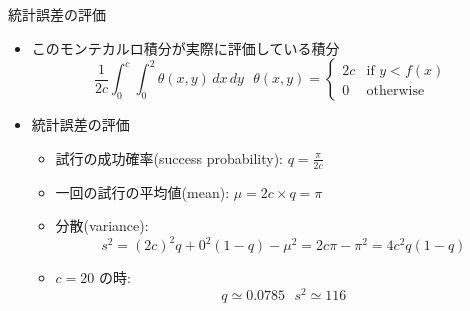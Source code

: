 \begin{frame}[t,fragile]{統計誤差の評価}
  \begin{itemize}
    \setlength{\itemsep}{1em}
  \item このモンテカルロ積分が実際に評価している積分
    \[
    \frac{1}{2c} \int_0^c \!\! \int_0^2 \!\! \theta(x,y) \, dx \, dy
    \ \ \ \theta(x,y) = \begin{cases} 2c & \text{if $y < f(x)$} \\ 0 & \text{otherwise} \end{cases}
    \]
  \item 統計誤差の評価
    \begin{itemize}
      \item 試行の成功確率(success probability): $q=\frac{\pi}{2c}$
      \item 一回の試行の平均値(mean): $\mu = 2c \times q = \pi$
      \item 分散(variance):
        \[ s^2 = (2c)^2q + 0^2(1-q) - \mu^2 = 2c\pi-\pi^2 = 4c^2 q(1-q) \]
      \item $c=20$ の時:
        \[ q \simeq 0.0785 \ \ \ s^2 \simeq 116
        \]
    \end{itemize}
  \end{itemize}
\end{frame}
